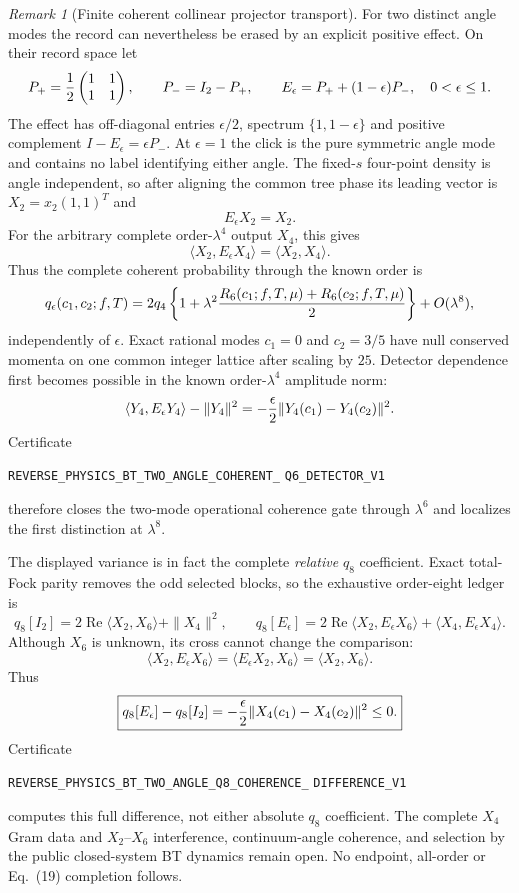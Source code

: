 \documentclass[11pt]{article}
\theoremstyle{definition}
\theoremstyle{remark}
\newtheorem{remark}[theorem]{Remark}
\begin{document}
\begin{remark}[Finite coherent collinear projector transport]
For two distinct angle modes the record can nevertheless be erased by an
explicit positive effect.  On their record space let
\[
 P_+={1\over2}\begin{pmatrix}1&1\\1&1\end{pmatrix},
 \qquad P_-=I_2-P_+,
 \qquad E_\epsilon=P_++(1-\epsilon)P_-,
 \quad0<\epsilon\leq1.
\]
The effect has off-diagonal entries $\epsilon/2$, spectrum
$\{1,1-\epsilon\}$ and positive complement
$I-E_\epsilon=\epsilon P_-$.  At $\epsilon=1$ the click is the pure
symmetric angle mode and contains no label identifying either angle.  The
fixed-$s$ four-point density is angle independent, so after aligning the
common tree phase its leading vector is
$X_2=x_2(1,1)^T$ and
\[
 E_\epsilon X_2=X_2.
\]
For the arbitrary complete order-$\lambda^4$ output $X_4$, this gives
\[
 \langle X_2,E_\epsilon X_4\rangle
 =\langle X_2,X_4\rangle.
\]
Thus the complete coherent probability through the known order is
\[
 q_\epsilon(c_1,c_2;f,T)
 =2q_4\left\{1+\lambda^2
 {R_6(c_1;f,T,\mu)+R_6(c_2;f,T,\mu)\over2}\right\}
 +O(\lambda^8),
\]
independently of $\epsilon$.  Exact rational modes $c_1=0$ and $c_2=3/5$
have null conserved momenta on one common integer lattice after scaling by
$25$.  Detector dependence first becomes possible in the known
order-$\lambda^4$ amplitude norm:
\[
 \langle Y_4,E_\epsilon Y_4\rangle-\|Y_4\|^2
 =-{\epsilon\over2}\|Y_4(c_1)-Y_4(c_2)\|^2.
\]
Certificate
\par\noindent
\texttt{REVERSE\_PHYSICS\_BT\_TWO\_ANGLE\_COHERENT\_}
\allowbreak\texttt{Q6\_DETECTOR\_V1}
\par\noindent
therefore closes the two-mode operational coherence gate through
$\lambda^6$ and localizes the first distinction at $\lambda^8$.

The displayed variance is in fact the complete \emph{relative} $q_8$
coefficient.  Exact total-Fock parity removes the odd selected blocks, so the
exhaustive order-eight ledger is
\[
 q_8[I_2]=2\operatorname{Re}\langle X_2,X_6\rangle+\|X_4\|^2,
 \qquad
 q_8[E_\epsilon]=2\operatorname{Re}\langle X_2,E_\epsilon X_6\rangle
 +\langle X_4,E_\epsilon X_4\rangle.
\]
Although $X_6$ is unknown, its cross cannot change the comparison:
\[
 \langle X_2,E_\epsilon X_6\rangle
 =\langle E_\epsilon X_2,X_6\rangle
 =\langle X_2,X_6\rangle.
\]
Thus
\[
 \boxed{q_8[E_\epsilon]-q_8[I_2]
 =-{\epsilon\over2}\|X_4(c_1)-X_4(c_2)\|^2\leq0.}
\]
Certificate
\par\noindent
\texttt{REVERSE\_PHYSICS\_BT\_TWO\_ANGLE\_Q8\_COHERENCE\_}
\allowbreak\texttt{DIFFERENCE\_V1}
\par\noindent
computes this full difference, not either absolute $q_8$ coefficient.  The
complete $X_4$ Gram data and $X_2$--$X_6$ interference, continuum-angle
coherence, and selection by the public closed-system BT dynamics remain open.
No endpoint, all-order or Eq.~(19) completion follows.


\end{remark}
\end{document}
